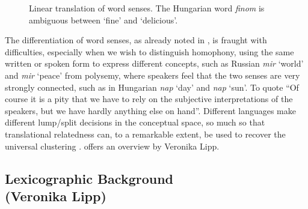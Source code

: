 \documentclass[11pt]{article}
\begin{document}
\begin{figure}[b]
    \centering
    \resizebox{\columnwidth}{!} {
    }
    \caption{Linear translation of word senses. The Hungarian word
        \emph{finom} is ambiguous between `fine' and `delicious'.}
        \label{fig:AdaGram}
\end{figure}

The differentiation of word senses, as already noted in \cite{Borbely:2016}, is
fraught with difficulties, especially when we wish to distinguish homophony,
using the same written or spoken form to express different concepts, such as
Russian {\it mir} `world' and {\it mir} `peace' from polysemy, where speakers
feel that the two senses are very strongly connected, such as in Hungarian {\it
nap} `day' and {\it nap} `sun'.  To quote \cite{Zgusta:1971} ``Of course it is
a pity that we have to rely on the subjective interpretations of the speakers,
but we have hardly anything else on hand''. %
Different languages make different lump/split decisions in the conceptual
space, so much so that translational relatedness can, to a remarkable extent,
be used to recover the universal clustering \citep{Youn:2016}.
 offers an overview by Veronika Lipp.

\subsection{Lexicographic Background \\ (Veronika Lipp)}
\end{document}
